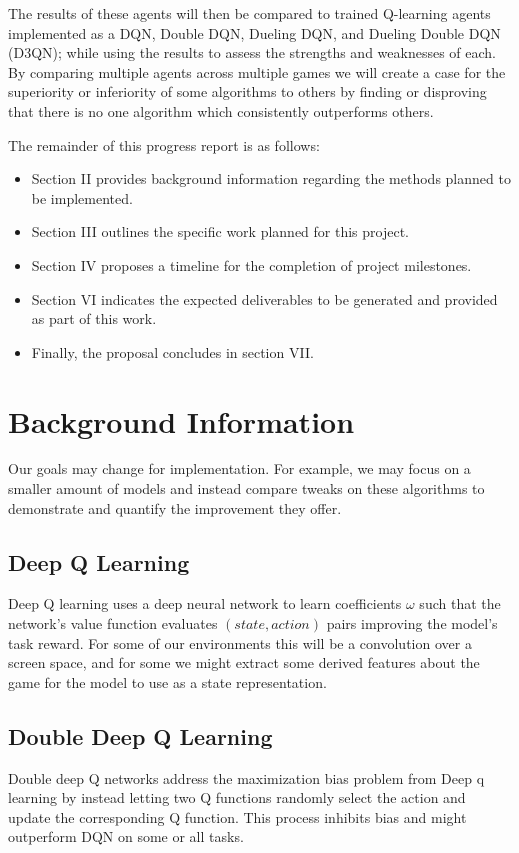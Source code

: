\documentclass[conference]{IEEEtran}
\begin{document}
The results of these agents will then be compared to trained Q-learning agents implemented as a DQN, Double DQN, Dueling DQN, and Dueling Double DQN (D3QN); while using the results to assess the strengths and weaknesses of each. By comparing multiple agents across multiple games we will create a case for the superiority or inferiority of some algorithms to others by finding or disproving that there is no one algorithm which consistently outperforms others.

The remainder of this progress report is as follows:
\begin{itemize}
\item Section II provides background information regarding the methods planned to be implemented.
\item Section III outlines the specific work planned for this project.
\item Section IV proposes a timeline for the completion of project milestones.
\item Section VI indicates the expected deliverables to be generated and provided as part of this work.
\item Finally, the proposal concludes in section VII.
\end{itemize}

\section{Background Information}
Our goals may change for implementation. For example, we may focus on a smaller amount of models and instead compare tweaks on these algorithms to demonstrate and quantify the improvement they offer.
\subsection{Deep Q Learning}
Deep Q learning uses a deep neural network to learn coefficients $\omega$ such that the network's value function evaluates $(state, action)$ pairs improving the model's task reward. For some of our environments this will be a convolution over a screen space, and for some we might extract some derived features about the game for the model to use as a state representation.

\subsection{Double Deep Q Learning}
Double deep Q networks address the maximization bias problem from Deep q learning by instead letting two Q functions randomly select the action and update the corresponding Q function. This process inhibits bias and might outperform DQN on some or all tasks.
\end{document}

